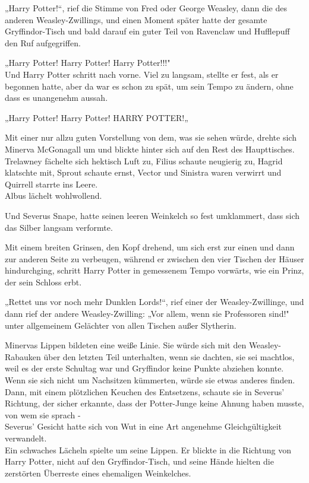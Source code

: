 {„Harry Potter!“, rief die Stimme von Fred oder George Weasley, dann die des anderen Weasley-Zwillings, und einen Moment später hatte der gesamte Gryffindor-Tisch und bald darauf ein guter Teil von Ravenclaw und Hufflepuff den Ruf aufgegriffen.

„Harry Potter! Harry Potter! Harry Potter!!!"\\ Und Harry Potter schritt nach vorne. Viel zu langsam, stellte er fest, als er begonnen hatte, aber da war es schon zu spät, um sein Tempo zu ändern, ohne dass es unangenehm aussah.

„Harry Potter! Harry Potter! HARRY POTTER!„

Mit einer nur allzu guten Vorstellung von dem, was sie sehen würde, drehte sich Minerva McGonagall um und blickte hinter sich auf den Rest des Haupttisches.\\ Trelawney fächelte sich hektisch Luft zu, Filius schaute neugierig zu, Hagrid klatschte mit, Sprout schaute ernst, Vector und Sinistra waren verwirrt und Quirrell starrte ins Leere.\\ Albus lächelt wohlwollend.

Und Severus Snape, hatte seinen leeren Weinkelch so fest umklammert, dass sich das Silber langsam verformte.

Mit einem breiten Grinsen, den Kopf drehend, um sich erst zur einen und dann zur anderen Seite zu verbeugen, während er zwischen den vier Tischen der Häuser hindurchging, schritt Harry Potter in gemessenem Tempo vorwärts, wie ein Prinz, der sein Schloss erbt.

„Rettet uns vor noch mehr Dunklen Lords!“, rief einer der Weasley-Zwillinge, und dann rief der andere Weasley-Zwilling: „Vor allem, wenn sie Professoren sind!"\\ unter allgemeinem Gelächter von allen Tischen außer Slytherin.

Minervas Lippen bildeten eine weiße Linie. Sie würde sich mit den Weasley-Rabauken über den letzten Teil unterhalten, wenn sie dachten, sie sei machtlos, weil es der erste Schultag war und Gryffindor keine Punkte abziehen konnte.\\ Wenn sie sich nicht um Nachsitzen kümmerten, würde sie etwas anderes finden. Dann, mit einem plötzlichen Keuchen des Entsetzens, schaute sie in Severus' Richtung, der sicher erkannte, dass der Potter-Junge keine Ahnung haben musste, von wem sie sprach -\\ Severus' Gesicht hatte sich von Wut in eine Art angenehme Gleichgültigkeit verwandelt.\\ Ein schwaches Lächeln spielte um seine Lippen. Er blickte in die Richtung von Harry Potter, nicht auf den Gryffindor-Tisch, und seine Hände hielten die zerstörten Überreste eines ehemaligen Weinkelches.

}
